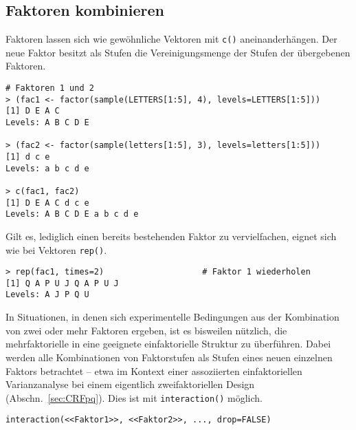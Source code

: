 \subsection{Faktoren kombinieren}
\label{sec:combFac}

Faktoren lassen sich wie gewöhnliche Vektoren mit \lstinline!c()! aneinanderhängen. Der neue Faktor besitzt als Stufen die Vereinigungsmenge der Stufen der übergebenen Faktoren.
\begin{lstlisting}
# Faktoren 1 und 2
> (fac1 <- factor(sample(LETTERS[1:5], 4), levels=LETTERS[1:5]))
[1] D E A C
Levels: A B C D E

> (fac2 <- factor(sample(letters[1:5], 3), levels=letters[1:5]))
[1] d c e
Levels: a b c d e

> c(fac1, fac2)
[1] D E A C d c e
Levels: A B C D E a b c d e
\end{lstlisting}

Gilt es, lediglich einen bereits bestehenden Faktor zu vervielfachen, eignet sich wie bei Vektoren \lstinline!rep()!.
\begin{lstlisting}
> rep(fac1, times=2)                    # Faktor 1 wiederholen
[1] Q A P U J Q A P U J
Levels: A J P Q U
\end{lstlisting}

In Situationen, in denen sich experimentelle Bedingungen aus der Kombination von zwei oder mehr Faktoren ergeben, ist es bisweilen nützlich, die mehrfaktorielle in eine geeignete einfaktorielle Struktur zu überführen. Dabei werden alle Kombinationen von Faktorstufen als Stufen eines neuen einzelnen Faktors betrachtet -- etwa im Kontext einer assoziierten einfaktoriellen Varianzanalyse bei einem eigentlich zweifaktoriellen Design (Abschn.\ \ref{sec:CRFpq}). Dies ist mit \lstinline!interaction()! möglich.
\begin{lstlisting}
interaction(<<Faktor1>>, <<Faktor2>>, ..., drop=FALSE)
\end{lstlisting}

